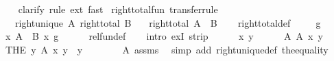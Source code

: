 \begin{isabellebody}
\ \ \isamarkupfalse%
\ {\isacharparenleft}{\kern0pt}clarify{\isacharcomma}{\kern0pt}\ rule\ ext{\isacharcomma}{\kern0pt}\ fast{\isacharparenright}{\kern0pt}%
\endisatagproof
{\isafoldproof}%
%
\isadelimproof
\isanewline
%
\endisadelimproof
\isanewline
{}\isamarkupfalse%
\ right{\isacharunderscore}{\kern0pt}total{\isacharunderscore}{\kern0pt}fun\ {\isacharbrackleft}{\kern0pt}transfer{\isacharunderscore}{\kern0pt}rule{\isacharbrackright}{\kern0pt}{\isacharcolon}{\kern0pt}\isanewline
\ \ \ {\isachardoublequoteopen}right{\isacharunderscore}{\kern0pt}unique\ A{\isachardoublequoteclose}\ {\isachardoublequoteopen}right{\isacharunderscore}{\kern0pt}total\ B{\isachardoublequoteclose}\isanewline
\ \ \ {\isachardoublequoteopen}right{\isacharunderscore}{\kern0pt}total\ {\isacharparenleft}{\kern0pt}A\ {\isacharequal}{\kern0pt}{\isacharequal}{\kern0pt}{\isacharequal}{\kern0pt}{\isachargreater}{\kern0pt}\ B{\isacharparenright}{\kern0pt}{\isachardoublequoteclose}\isanewline
%
\isadelimproof
\ \ %
\endisadelimproof
%
\isatagproof
{}\isamarkupfalse%
\ right{\isacharunderscore}{\kern0pt}total{\isacharunderscore}{\kern0pt}def\ \isanewline
{}\isamarkupfalse%
\isanewline
\ \ \isamarkupfalse%
\ g\isanewline
\ \ \isamarkupfalse%
\ {\isachardoublequoteopen}{\isasymexists}x{\isachardot}{\kern0pt}\ {\isacharparenleft}{\kern0pt}A\ {\isacharequal}{\kern0pt}{\isacharequal}{\kern0pt}{\isacharequal}{\kern0pt}{\isachargreater}{\kern0pt}\ B{\isacharparenright}{\kern0pt}\ x\ g{\isachardoublequoteclose}\isanewline
\ \ \ \ \isamarkupfalse%
\ rel{\isacharunderscore}{\kern0pt}fun{\isacharunderscore}{\kern0pt}def\isanewline
\ \ \isamarkupfalse%
\ {\isacharparenleft}{\kern0pt}intro\ exI\ strip{\isacharparenright}{\kern0pt}\isanewline
\ \ \ \ \isamarkupfalse%
\ x\ y\isanewline
\ \ \ \ \isamarkupfalse%
\ A{\isacharcolon}{\kern0pt}\ {\isachardoublequoteopen}A\ x\ y{\isachardoublequoteclose}\isanewline
\ \ \ \ \isamarkupfalse%
\ {\isachardoublequoteopen}{\isacharparenleft}{\kern0pt}THE\ y{\isachardot}{\kern0pt}\ A\ x\ y{\isacharparenright}{\kern0pt}\ {\isacharequal}{\kern0pt}\ y{\isachardoublequoteclose}\isanewline
\ \ \ \ \ \ \isamarkupfalse%
\ A\ assms\ \isamarkupfalse%
\ {\isacharparenleft}{\kern0pt}simp\ add{\isacharcolon}{\kern0pt}\ right{\isacharunderscore}{\kern0pt}unique{\isacharunderscore}{\kern0pt}def\ the{\isacharunderscore}{\kern0pt}equality{\isacharparenright}{\kern0pt}\isanewline

\end{isabellebody}

